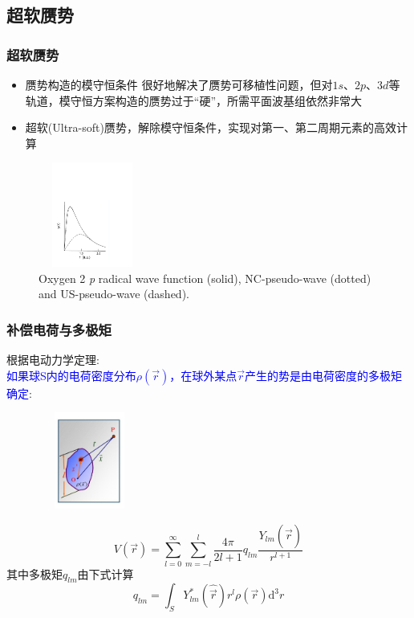 \subsection{超软赝势}
\frame
{
\frametitle{超软赝势}
\begin{itemize}
\setlength{\itemsep}{5pt}
	\item 赝势构造的模守恒条件
	很好地解决了赝势可移植性问题，但对$1s$、$2p$、$3d$等轨道，模守恒方案构造的赝势过于“硬”，所需平面波基组依然非常大
	\item 超软\textrm{(Ultra-soft)}赝势，解除模守恒条件，实现对第一、第二周期元素的高效计算
\end{itemize}
\begin{figure}[h!]
\vspace*{-0.10in}
\centering
\includegraphics[height=1.35in,width=1.40in,viewport=30 55 415 500,clip]{Figures/Norm-US-wave.pdf}
\caption{\tiny \textrm{Oxygen 2} \textit{p} \textrm{radical wave function (solid), NC-pseudo-wave (dotted) and US-pseudo-wave (dashed).}}%
\label{Norm-US-wave}
\end{figure}
}

\frame
{
\frametitle{补偿电荷与多极矩}
根据电动力学定理:\\\textcolor{blue}{如果球\textrm{S}内的电荷密度分布$\rho(\vec r)$，在球外某点$\vec r$产生的势是由电荷密度的多极矩确定}:
\begin{figure}[h!]
\vspace*{-15pt}
\centering
\includegraphics[height=1.25in,width=1.32in,viewport=1 22 507 575,clip]{Figures/potential_multipole.jpg}
\label{Potential-multipole}
\end{figure}
\begin{displaymath}
	V(\vec r)=\sum_{l=0}^{\infty}\sum_{m=-l}^{l}\dfrac{4\pi}{2l+1}q_{lm}\dfrac{Y_{lm}(\hat{\vec r})}{r^{l+1}}
\end{displaymath}
其中多极矩$q_{lm}$由下式计算
\begin{displaymath}
	q_{lm}=\int_SY_{lm}^{\ast}(\hat{\vec r})r^l\rho(\vec r)\mathrm{d}^3r
\end{displaymath}
}


